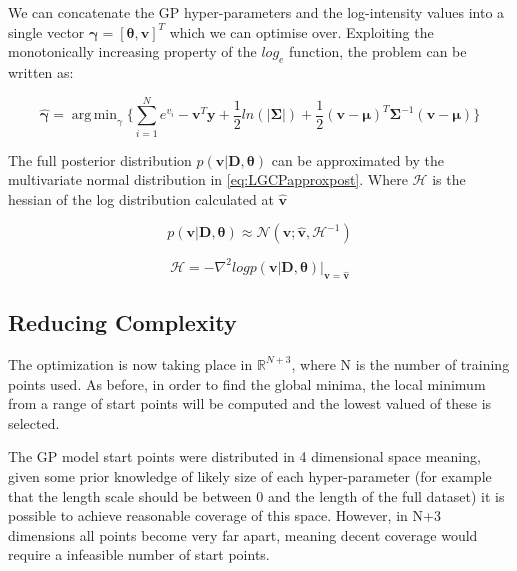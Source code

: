 \documentclass[a4paper,11pt]{report}
\DeclareMathOperator*{\argmin}{arg\,min}
\begin{document}
\doublespacing 

We can concatenate the GP hyper-parameters and the log-intensity values into a single vector \( \boldsymbol{\gamma} = [\boldsymbol{\theta}, \mathbf{v}]^{T}\) which we can optimise over. Exploiting the monotonically increasing property of the \(log_e\) function, the problem can be written as:

\begin{equation} \label{eq:GPfmin}
\hat{\boldsymbol{\gamma}} = \argmin_\gamma{\{ \sum_{i=1}^{N}e^{v_i} - \mathbf{v}^{T}\mathbf{y} + \frac{1}{2}ln(|\boldsymbol{\Sigma}|) + \frac{1}{2}(\mathbf{v}-\boldsymbol{\mu})^{T}\boldsymbol{\Sigma}^{-1}(\mathbf{v}-\boldsymbol{\mu})\}}
\end{equation}

The full posterior distribution \(p(\mathbf{v|D},\boldsymbol{\theta})\) can be approximated by the multivariate normal distribution in \ref{eq:LGCPapproxpost}. Where \(\boldsymbol{\mathcal{H}}\) is the hessian of the log distribution calculated at \(\hat{\mathbf{v}}\) 

\singlespacing
\begin{equation} \label{eq:LGCPapproxpost}
p(\mathbf{v|D},\boldsymbol{\theta}) \approx \mathcal{N} (\mathbf{v}; \hat{\mathbf{v}}, \boldsymbol{\mathcal{H}}^{-1})
\end{equation}

\begin{equation}
\boldsymbol{\mathcal{H}} = -\nabla^2 log p(\mathbf{v|D},\boldsymbol{\theta}) |_{\mathbf{v}=\hat{\mathbf{v}}}
\end{equation}
\doublespacing

\subsection{Reducing Complexity}

The optimization is now taking place in \(\mathds{R}^{N+3}\), where N is the number of training points used. As before, in order to find the global minima, the local minimum from a range of start points will be computed and the lowest valued of these is selected.

The GP model start points were distributed in 4 dimensional space meaning, given some prior knowledge of likely size of each hyper-parameter (for example that the length scale should be between 0 and the length of the full dataset) it is possible to achieve reasonable coverage of this space. However, in N+3 dimensions all points become very far apart, meaning decent coverage would require a infeasible number of start points.
\end{document}
